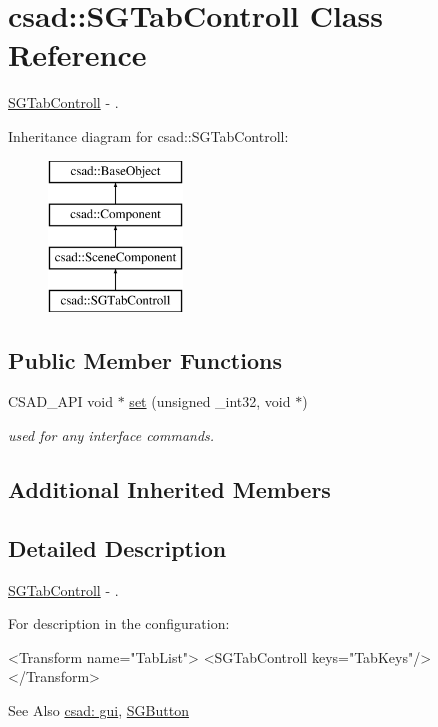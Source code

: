 \hypertarget{classcsad_1_1_s_g_tab_controll}{\section{csad\-:\-:S\-G\-Tab\-Controll Class Reference}
\label{classcsad_1_1_s_g_tab_controll}
}


\hyperlink{classcsad_1_1_s_g_tab_controll}{S\-G\-Tab\-Controll} -\/ .  


Inheritance diagram for csad\-:\-:S\-G\-Tab\-Controll\-:\begin{figure}[H]
\begin{center}
\leavevmode
\includegraphics[height=4.000000cm]{classcsad_1_1_s_g_tab_controll}
\end{center}
\end{figure}
\subsection*{Public Member Functions}
\begin{DoxyCompactItemize}
\item 
\hypertarget{classcsad_1_1_s_g_tab_controll_ae535ab52a7000f97913e31b0af7a5a41}{C\-S\-A\-D\-\_\-\-A\-P\-I void $\ast$ \hyperlink{classcsad_1_1_s_g_tab_controll_ae535ab52a7000f97913e31b0af7a5a41}{set} (unsigned \-\_\-int32, void $\ast$)}\label{classcsad_1_1_s_g_tab_controll_ae535ab52a7000f97913e31b0af7a5a41}

\begin{DoxyCompactList}\small\item\em used for any interface commands. \end{DoxyCompactList}\end{DoxyCompactItemize}
\subsection*{Additional Inherited Members}


\subsection{Detailed Description}
\hyperlink{classcsad_1_1_s_g_tab_controll}{S\-G\-Tab\-Controll} -\/ . 

For description in the configuration\-: \begin{DoxyVerb}  <Transform name="TabList">
     <SGTabControll keys="TabKeys"/>
  </Transform>
\end{DoxyVerb}


\begin{DoxySeeAlso}{See Also}
\hyperlink{group__scenegui}{csad\-: gui}, \hyperlink{classcsad_1_1_s_g_button}{S\-G\-Button} 
\end{DoxySeeAlso}
